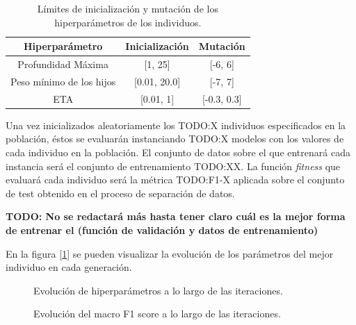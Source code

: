         \begin{table}[H]
            \centering
                \begin{tabular}{ |c|c|c| } 
                \hline
                \textbf{Hiperparámetro} & \textbf{Inicialización} & \textbf{Mutación}\\
                \hline
                    Profundidad Máxima & [1, 25] & [-6, 6]\\ 
                    Peso mínimo de los hijos & [0.01, 20.0] & [-7, 7] \\ 
                    ETA & [0.01, 1] &  [-0.3, 0.3] \\ 
                \hline

                \end{tabular}

            \caption{Límites de inicialización y mutación de los hiperparámetros de los individuos.}
            \label{InitAndMutationLimitsHyperparamsTable}
        \end{table}

        Una vez inicializados aleatoriamente los TODO:X individuos especificados en la población, éstos se evaluarán instanciando TODO:X modelos con los valores de cada individuo en la población. El conjunto de datos sobre el que entrenará cada instancia  será el conjunto de entrenamiento TODO:XX. La función \textit{fitness} que evaluará cada individuo será la métrica TODO:F1-X aplicada sobre el conjunto de test obtenido en el proceso de separación de datos.

        \textbf{TODO: No se redactará más hasta tener claro cuál es la mejor forma de entrenar el  (función de validación y datos de entrenamiento)}

        En la figura [\ref{EvolucionHiperparametrosImage}] se pueden visualizar la evolución de los parámetros del mejor individuo en cada generación.

        \begin{figure}[H]
            \centering
            
            \caption{Evolución de hiperparámetros a lo largo de las iteraciones.}
            \label{EvolucionHiperparametrosImage}
         \end{figure}

        \begin{figure}[H]
            \centering
            
            \caption{Evolución del macro F1 score a lo largo de las iteraciones.}
            \label{EvolucionF1ScoreImage}
         \end{figure}
         
